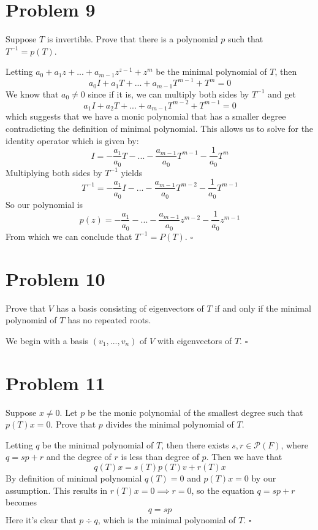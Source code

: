 \documentclass[12pt]{article}
\newenvironment{proof}{\noindent{\bf Proof.}}{\hfill $\square$\medskip}
\begin{document}
\section{Problem 9}
Suppose $T$ is invertible. Prove that there is a polynomial $p$ such that $T^{-1}=p(T)$.

\begin{proof}
Letting $a_{0}+a_{1}z+...+a_{m-1}z^{z-1}+z^{m}$ be the minimal polynomial of $T$, then
$$a_{0}I+a_{1}T+...+a_{m-1}T^{m-1}+T^{m}=0$$
We know that $a_{0}\neq0$ since if it is, we can multiply both sides by $T^{-1}$ and get
$$a_{1}I+a_{2}T+...+a_{m-1}T^{m-2}+T^{m-1}=0$$
which suggests that we have a monic polynomial that has a smaller degree contradicting the definition of minimal polynomial. This allows us to solve for the identity operator which is given by:
$$I=-\frac{a_{1}}{a_{0}}T-...-\frac{a_{m-1}}{a_{0}}T^{m-1}-\frac{1}{a_{0}}T^{m}$$
Multiplying both sides by $T^{-1}$ yields
$$T^{-1}=-\frac{a_{1}}{a_{0}}I-...-\frac{a_{m-1}}{a_{0}}T^{m-2}-\frac{1}{a_{0}}T^{m-1}$$
So our polynomial is 
$$p(z)=-\frac{a_{1}}{a_{0}}-...-\frac{a_{m-1}}{a_{0}}z^{m-2}-\frac{1}{a_{0}}z^{m-1}$$
From which we can conclude that $T^{-1}=P(T)$.
\end{proof}


\section{Problem 10}
Prove that $V$ has a basis consisting of eigenvectors of $T$ if and only if the minimal polynomial of $T$ has no repeated roots.

\begin{proof}
We begin with a basis $(v_{1},...,v_{n})$ of $V$ with eigenvectors of $T$.
\end{proof}


\section{Problem 11}
Suppose $x\neq 0$. Let $p$ be the monic polynomial of the smallest degree such that $p(T)x=0$. Prove that $p$ divides the minimal polynomial of $T$.

\begin{proof}
Letting $q$ be the minimal polynomial of $T$, then there exists $s,r\in \mathcal{P}(F)$, where $q=sp+r$ and the degree of $r$ is less than degree of $p$. Then we have that
$$q(T)x=s(T)p(T)v+r(T)x$$
By definition of minimal polynomial $q(T)=0$ and $p(T)x=0$ by our assumption. This results in $r(T)x=0\implies r=0$, so the equation $q=sp+r$ becomes
$$q=sp$$
Here it's clear that $p\div q$, which is the minimal polynomial of $T$.
\end{proof}
\end{document}

